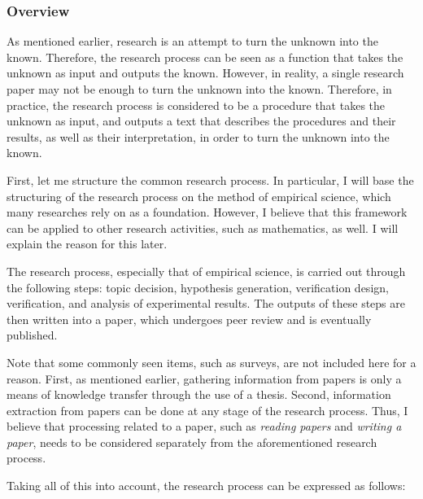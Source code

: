 \documentclass{article}
\begin{document}
\subsubsection{Overview}

As mentioned earlier, research is an attempt to turn the unknown into the known. Therefore, the research process can be seen as a function that takes the unknown as input and outputs the known. However, in reality, a single research paper may not be enough to turn the unknown into the known. Therefore, in practice, the research process is considered to be a procedure that takes the unknown as input, and outputs a text that describes the procedures and their results, as well as their interpretation, in order to turn the unknown into the known.

First, let me structure the common research process. In particular, I will base the structuring of the research process on the method of empirical science, which many researches rely on as a foundation. However, I believe that this framework can be applied to other research activities, such as mathematics, as well. I will explain the reason for this later.

The research process, especially that of empirical science, is carried out through the following steps: topic decision, hypothesis generation, verification design, verification, and analysis of experimental results. The outputs of these steps are then written into a paper, which undergoes peer review and is eventually published.

Note that some commonly seen items, such as surveys, are not included here for a reason. First, as mentioned earlier, gathering information from papers is only a means of knowledge transfer through the use of a thesis. Second, information extraction from papers can be done at any stage of the research process. Thus, I believe that processing related to a paper, such as \textit{reading papers} and \textit{writing a paper}, needs to be considered separately from the aforementioned research process.

Taking all of this into account, the research process can be expressed as follows:
\end{document}
